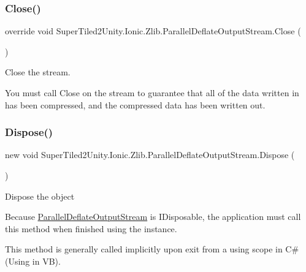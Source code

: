 \subsubsection{\texorpdfstring{Close()}{Close()}}
{\footnotesize\ttfamily override void Super\+Tiled2\+Unity.\+Ionic.\+Zlib.\+Parallel\+Deflate\+Output\+Stream.\+Close (\begin{DoxyParamCaption}{ }\end{DoxyParamCaption})}



Close the stream. 

You must call Close on the stream to guarantee that all of the data written in has been compressed, and the compressed data has been written out. \mbox{\label{class_super_tiled2_unity_1_1_ionic_1_1_zlib_1_1_parallel_deflate_output_stream_a641dacebcb67562f7b384dfe5468f69b}} 
\subsubsection{\texorpdfstring{Dispose()}{Dispose()}\hspace{0.1cm}{\footnotesize\ttfamily [1/2]}}
{\footnotesize\ttfamily new void Super\+Tiled2\+Unity.\+Ionic.\+Zlib.\+Parallel\+Deflate\+Output\+Stream.\+Dispose (\begin{DoxyParamCaption}{ }\end{DoxyParamCaption})}



Dispose the object

Because \mbox{\hyperlink{class_super_tiled2_unity_1_1_ionic_1_1_zlib_1_1_parallel_deflate_output_stream}{Parallel\+Deflate\+Output\+Stream}} is I\+Disposable, the application must call this method when finished using the instance. 

This method is generally called implicitly upon exit from a {\ttfamily using} scope in C\# ({\ttfamily Using} in VB). \mbox{\label{class_super_tiled2_unity_1_1_ionic_1_1_zlib_1_1_parallel_deflate_output_stream_a39a87bd93dc374bbd39308da9619da3b}} 
